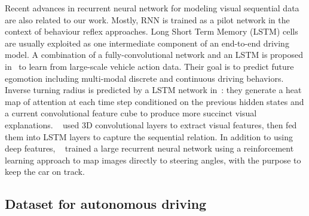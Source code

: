 \documentclass[10pt,twocolumn,letterpaper]{article}
\begin{document}
Recent advances in recurrent neural network for modeling visual sequential data are also related to our work.
Mostly, RNN is trained as a pilot network in the context of behaviour reflex approaches.
Long Short Term Memory (LSTM) cells are usually exploited as one intermediate component of an end-to-end driving model.
 A combination of a fully-convolutional network and an LSTM is proposed in~\cite{xu2017end} to learn from large-scale vehicle action data. Their goal is to predict future egomotion including multi-modal discrete and continuous driving behaviors.
 Inverse turning radius is predicted by a LSTM network in~\cite{kim2017interpretable}: they generate a heat map of attention at each time step conditioned on the previous hidden states and a current convolutional feature cube  to produce more succinct visual explanations. ~\cite{duself} used 3D convolutional layers to extract visual features, then fed them into LSTM layers to capture the sequential relation. In addition to using deep features, ~\cite{koutnik2013evolving} trained a large recurrent neural network using a reinforcement learning approach to map images directly to steering angles, with the purpose to keep the car on track.



\subsection{Dataset for autonomous driving}
\end{document}
